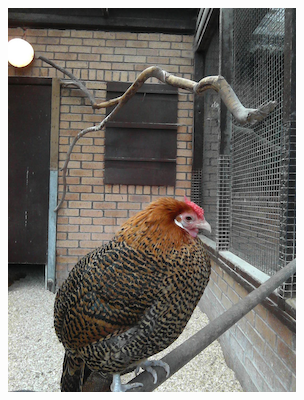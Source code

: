 \documentclass{l4proj}
\begin{document}
\begin{figure}[ht]
\begin{subfigure}[h!]{0.18\textwidth}
    \includegraphics[width=\textwidth, trim={0cm 1.6cm 0cm 1.6cm}, clip]{images/dataset/pretty_chicken/rgb.png}

\end{subfigure}
\end{figure}
\end{document}
